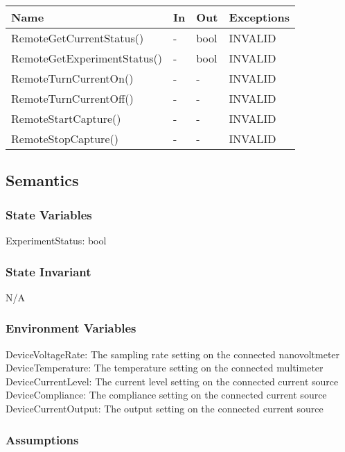 \documentclass[12pt, titlepage]{article}
\begin{document}
\begin{center}
\begin{tabular}{p{7cm} p{3cm} p{1cm} p{3cm}}
\hline
\textbf{Name} & \textbf{In} & \textbf{Out} & \textbf{Exceptions} \\
\hline
 RemoteGetCurrentStatus() & - & bool & INVALID \\
 RemoteGetExperimentStatus() & - & bool & INVALID \\
 RemoteTurnCurrentOn() & - & - & INVALID \\
 RemoteTurnCurrentOff() & - & - & INVALID \\
 RemoteStartCapture() & - & - & INVALID \\
 RemoteStopCapture() & - & - & INVALID \\

\hline
\end{tabular}
\end{center}

\subsection{Semantics}

\subsubsection{State Variables}

ExperimentStatus: bool

\subsubsection{State Invariant}

N/A

\subsubsection{Environment Variables}
DeviceVoltageRate: The sampling rate setting on the connected nanovoltmeter\\
DeviceTemperature: The temperature setting on the connected multimeter\\
DeviceCurrentLevel: The current level setting on the connected current source\\
DeviceCompliance: The compliance setting on the connected current source\\
DeviceCurrentOutput: The output setting on the connected current source \\

\subsubsection{Assumptions}
\end{document}
